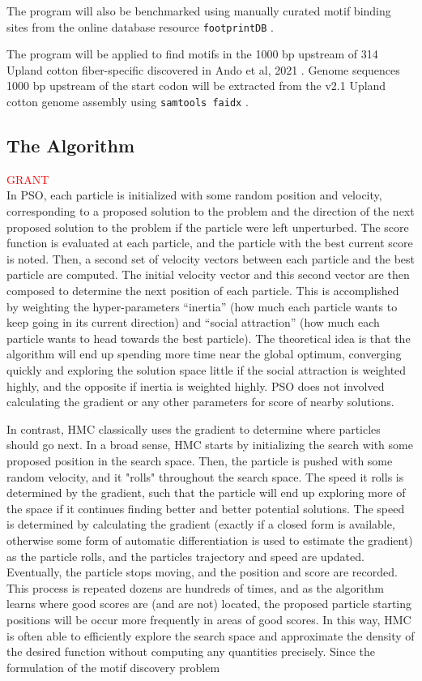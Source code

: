 \documentclass{article}
\begin{document}
  The program will also be benchmarked using manually curated motif binding sites from the online database resource \texttt{footprintDB} \cite{sebastian2014footprintdb}.  

  The program will be applied to find motifs in the 1000 bp upstream of 314 Upland cotton fiber-specific discovered in Ando et al, 2021 \cite{ando2021lcm}. Genome sequences 1000 bp upstream of the start codon will be extracted from the v2.1 Upland cotton genome assembly \cite{chen2020genomic} using \texttt{samtools faidx} \cite{li2009sequence}.
\subsection{The Algorithm}
\textcolor{red}{GRANT} \\
In PSO, each particle is initialized with some random position and velocity, corresponding to a proposed solution to the problem and the direction of the next proposed solution to the problem if the particle were left unperturbed. The score function is evaluated at each particle, and the particle with the best current score is noted. Then, a second set of velocity vectors between each particle and the best particle are computed. The initial velocity vector and this second vector are then composed to determine the next position of each particle. This is accomplished by weighting the hyper-parameters ``inertia'' (how much each particle wants to keep going in its current direction) and ``social attraction'' (how much each particle wants to head towards the best particle). The theoretical idea is that the algorithm will end up spending more time near the global optimum, converging quickly and exploring the solution space little if the social attraction is weighted highly, and the opposite if inertia is weighted highly. PSO does not involved calculating the gradient or any other parameters for score of nearby solutions.
  
  In contrast, HMC classically uses the gradient to determine where particles should go next. In a broad sense, HMC starts by initializing the search with some proposed position in the search space. Then, the particle is pushed with some random velocity, and it "rolls" throughout the search space. The speed it rolls is determined by the gradient, such that the particle will end up exploring more of the space if it continues finding better and better potential solutions. The speed is determined by calculating the gradient (exactly if a closed form is available, otherwise some form of automatic differentiation is used to estimate the gradient) as the particle rolls, and the particles trajectory and speed are updated. Eventually, the particle stops moving, and the position and score are recorded. This process is repeated dozens are hundreds of times, and as the algorithm learns where good scores are (and are not) located, the proposed particle starting positions will be occur more frequently in areas of good scores. In this way, HMC is often able to efficiently explore the search space and approximate the density of the desired function without computing any quantities precisely. Since the formulation of the motif discovery problem 
  
\end{document}
